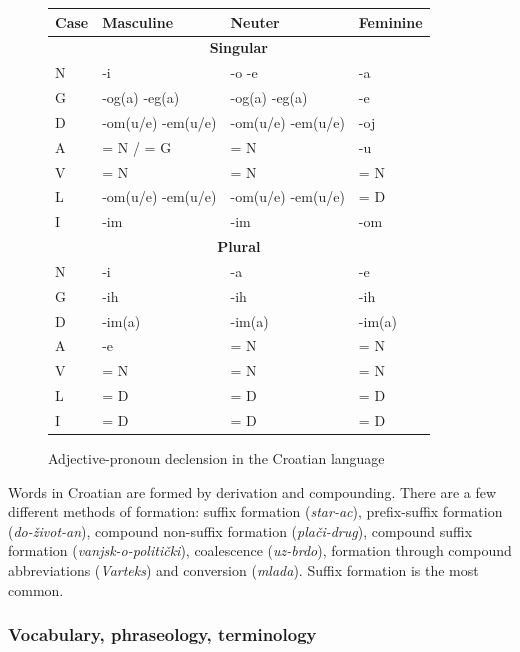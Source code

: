 \begin{multicols}{2}
\begin{figure}[htb]
\centering
    \begin{tabular}{|l|l|l|l|}
        \hline
        \textbf{Case} & \textbf{Masculine}        & \textbf{Neuter}       & \textbf{Feminine} \\ \hline
		\multicolumn{4}{|c|}{\textbf{Singular}} \\ \hline
        N     & -i                & -o -e             & -a\\ 
        G     & -og(a) -eg(a)     & -og(a) -eg(a)     & -e\\ 
        D     & -om(u/e) -em(u/e) & -om(u/e) -em(u/e) & -oj\\ 
        A     & = N / = G         & = N               & -u\\ 
        V     & = N               & = N               & = N\\ 
        L     & -om(u/e) -em(u/e) & -om(u/e) -em(u/e) & = D\\ 
        I     & -im               & -im               & -om\\ \hline
		\multicolumn{4}{|c|}{\textbf{Plural}} \\ \hline
		N     & -i        & -a         & -e\\ 
        G     & -ih       & -ih        & -ih\\ 
        D     & -im(a)    & -im(a)     & -im(a)\\ 
        A     & -e        & = N        & = N\\ 
        V     & = N       & = N        & = N\\ 
        L     & = D       & = D        & = D\\ 
        I     & = D       & = D        & = D\\
        \hline
   \end{tabular}
  \caption{Adjective-pronoun declension in the Croatian language}
  \label{fig:zamjenicka_en}
\end{figure}

Words in Croatian are formed by derivation and compounding. There are a few different methods of formation: suffix formation (\emph{star-ac}), prefix-suffix formation (\emph{do-život-an}), compound non-suffix formation (\emph{plači-drug}), compound suffix formation (\emph{vanjsk-o-politički}), coalescence (\emph{uz-brdo}), formation through compound abbreviations (\emph{Varteks}) and conversion (\emph{mlada}). Suffix formation is the most common. 

\subsubsection{Vocabulary, phraseology, terminology}


\end{multicols}
